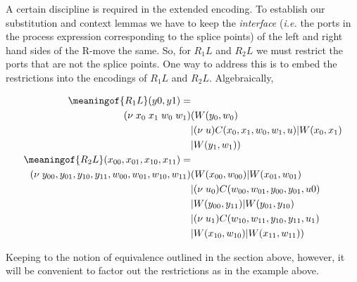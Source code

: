 A certain discipline is required in the extended encoding. To
establish our substitution and context lemmas we have to keep the
\textit{interface} (\emph{i.e.} the ports in the process expression
corresponding to the splice points) of the left and right hand sides
of the R-move the same. So, for $R_{1}L$ and $R_{2}L$ we must restrict the ports
that are not the splice points. One way to address this is to embed
the restrictions into the encodings of $R_{1}L$ and $R_{2}L$. Algebraically,


\begin{align*}
  \meaningof{R_{1}L}(y0,y1) = & \\
  (\nu \; x_{0} \; x_{1} \; w_{0} \; w_{1} ) & (W(y_{0},w_{0}) \\
  & |(\nu \; u)C(x_{0},x_{1},w_{0},w_{1},u) | W(x_{0},x_{1}) \\
  & | W(y_{1},w_{1})) \\
  \meaningof{R_{2}L}(x_{00},x_{01},x_{10},x_{11}) = & \\
  (\nu \; y_{00},y_{01},y_{10},y_{11},w_{00},w_{01},w_{10},w_{11}) & (W(x_{00},w_{00}) | W(x_{01},w_{01}) \\
  & | (\nu \; u_{0})C(w_{00},w_{01},y_{00},y_{01},u{0}) \\
  & | W(y_{00},y_{11}) | W(y_{01},y_{10}) \\
  & | (\nu \; u_{1})C(w_{10},w_{11},y_{10},y_{11},u_1) \\
  & | W(x_{10},w_{10}) | W(x_{11},w_{11}))
\end{align*}

  Keeping to the notion of equivalence outlined in the section above,
  however, it will be convenient to factor out the restrictions as in
  the example above.

